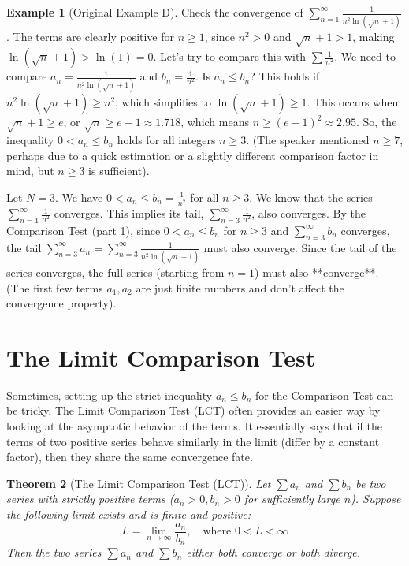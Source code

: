 \documentclass[11pt]{article}
\theoremstyle{plain}
\newtheorem{theorem}{Theorem}[section]
\theoremstyle{definition}
\newtheorem{example}[theorem]{Example}
\theoremstyle{remark}
\theoremstyle{adminstyle}
\begin{document}
\begin{example}[Original Example D] \label{ex:n2_ln_sqrt_n_plus_1}
Check the convergence of $\sum_{n=1}^{\infty} \frac{1}{n^2 \ln(\sqrt{n} + 1)}$.
The terms are clearly positive for $n \ge 1$, since $n^2 > 0$ and $\sqrt{n}+1 > 1$, making $\ln(\sqrt{n}+1) > \ln(1) = 0$.
Let's try to compare this with $\sum \frac{1}{n^2}$. We need to compare $a_n = \frac{1}{n^2 \ln(\sqrt{n} + 1)}$ and $b_n = \frac{1}{n^2}$.
Is $a_n \le b_n$? This holds if $n^2 \ln(\sqrt{n} + 1) \ge n^2$, which simplifies to $\ln(\sqrt{n} + 1) \ge 1$.
This occurs when $\sqrt{n} + 1 \ge e$, or $\sqrt{n} \ge e-1 \approx 1.718$, which means $n \ge (e-1)^2 \approx 2.95$.
So, the inequality $0 < a_n \le b_n$ holds for all integers $n \ge 3$. (The speaker mentioned $n \ge 7$, perhaps due to a quick estimation or a slightly different comparison factor in mind, but $n \ge 3$ is sufficient).

Let $N=3$. We have $0 < a_n \le b_n = \frac{1}{n^2}$ for all $n \ge 3$.
We know that the series $\sum_{n=1}^{\infty} \frac{1}{n^2}$ converges. This implies its tail, $\sum_{n=3}^{\infty} \frac{1}{n^2}$, also converges.
By the Comparison Test (part 1), since $0 < a_n \le b_n$ for $n \ge 3$ and $\sum_{n=3}^{\infty} b_n$ converges, the tail $\sum_{n=3}^{\infty} a_n = \sum_{n=3}^{\infty} \frac{1}{n^2 \ln(\sqrt{n} + 1)}$ must also converge.
Since the tail of the series converges, the full series (starting from $n=1$) must also **converge**. (The first few terms $a_1, a_2$ are just finite numbers and don't affect the convergence property).
\end{example}

\section{The Limit Comparison Test}

Sometimes, setting up the strict inequality $a_n \le b_n$ for the Comparison Test can be tricky. The Limit Comparison Test (LCT) often provides an easier way by looking at the asymptotic behavior of the terms. It essentially says that if the terms of two positive series behave similarly in the limit (differ by a constant factor), then they share the same convergence fate.

\begin{theorem}[The Limit Comparison Test (LCT)]
Let $\sum a_n$ and $\sum b_n$ be two series with strictly positive terms ($a_n > 0, b_n > 0$ for sufficiently large $n$). Suppose the following limit exists and is finite and positive:
\[ L = \lim_{n\to\infty} \frac{a_n}{b_n}, \quad \text{where } 0 < L < \infty \]
Then the two series $\sum a_n$ and $\sum b_n$ either both converge or both diverge.
\end{theorem}
\end{document}
